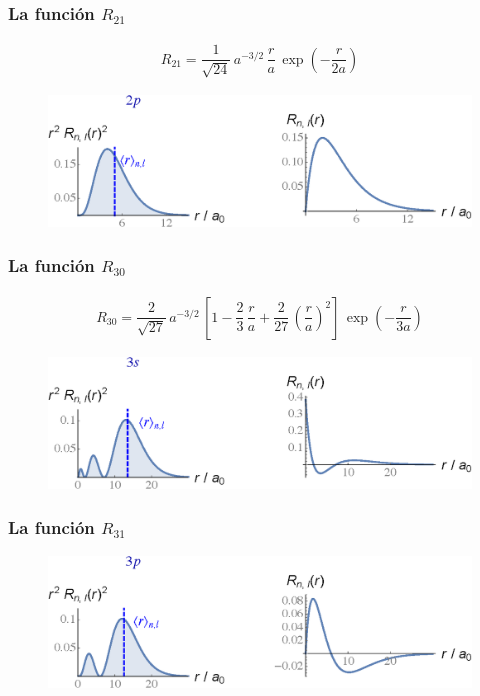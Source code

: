 \documentclass[12pt]{beamer}
\begin{document}
\begin{frame}
\frametitle{La función $R_{21}$}
\begin{align*}
R_{21} = \dfrac{1}{\sqrt{24}} \, a^{-3/2} \, \dfrac{r}{a} \, \exp(-\dfrac{r}{2a})
\end{align*}
\pause
\vspace*{-0.5cm}
\begin{figure}
   \centering
   \includegraphics[scale=0.67]{Imagenes/Plot_Funcion_Radial_21.eps}
\end{figure}
\end{frame}
\begin{frame}
\frametitle{La función $R_{30}$}
\begin{align*}
R_{30} = \dfrac{2}{\sqrt{27}} \, a^{-3/2} \, \left[ 1 {-} \dfrac{2}{3} \, \dfrac{r}{a} {+} \dfrac{2}{27} \, \left( \dfrac{r}{a} \right)^{2} \right] \, \exp(-\dfrac{r}{3a})
\end{align*}
\pause
\vspace*{-0.5cm}
\begin{figure}
   \centering
   \includegraphics[scale=0.67]{Imagenes/Plot_Funcion_Radial_30.eps}
\end{figure}
\end{frame}
\begin{frame}
   \frametitle{La función $R_{31}$}
\begin{figure}
   \centering
   \includegraphics[scale=0.67]{Imagenes/Plot_Funcion_Radial_31.eps}
\end{figure}
\end{frame}
\end{document}

